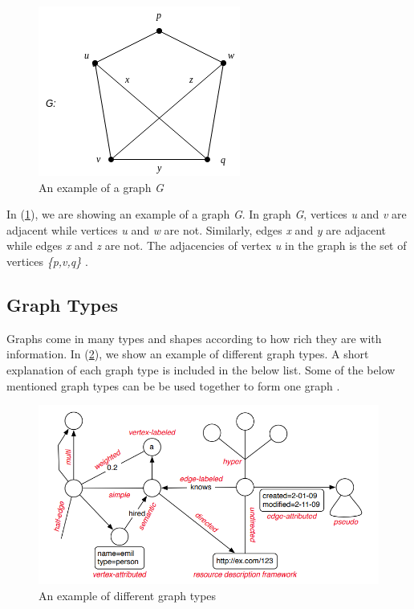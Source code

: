 {\begin{figure}
\centering
\includegraphics{pics/Graph.png}
\caption{An example of a graph \textit{G} \cite{harary6graph}}
\label{fig_graph}
\end{figure} 

In (\ref{fig_graph}), we are showing an example of a graph \textit{G}. In graph \textit{G}, vertices \textit{u} and \textit{v} are adjacent while vertices \textit{u} and \textit{w} are not. Similarly, edges \textit{x} and \textit{y} are adjacent while edges \textit{x} and \textit{z} are not. The adjacencies of vertex \textit{u} in the graph is the set of vertices \textit{\{p,v,q\}} \cite{harary6graph}.




\subsection{Graph Types}
\label{subsec:GraphTypes}

Graphs come in many types and shapes according to how rich they are with information. In (\ref{fig_graph-types}), we show an example of different graph types. A short explanation of each graph type is included in the below list. Some of the below mentioned graph types can be be used together to form one graph \cite{DBLP:journals/corr/abs-1006-2361}.


\begin{figure}
\centering
\includegraphics[width=16cm]{pics/graph-types.png}
\caption{An example of different graph types \cite{DBLP:journals/corr/abs-1006-2361}}
\label{fig_graph-types}
\end{figure} 

}
